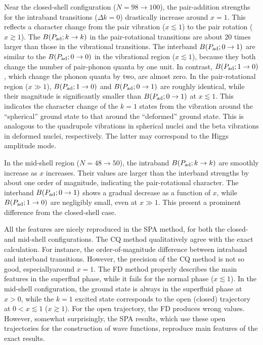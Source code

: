 \documentclass[%
superscriptaddress,
preprint,
showpacs,
nofootinbib,
amsmath,amssymb,
prc,
floatfix ]%
{revtex4-1}
\begin{document}
Near the closed-shell configuration ($N=98\rightarrow 100$),
the pair-addition strengths for the intraband transitions ($\Delta k=0$)
drastically increase around $x=1$.
This reflects a character change from the pair vibration ($x\lesssim 1$)
to the pair rotation ($x\gtrsim 1$).
The $B(P_{\rm ad}; k\rightarrow k)$ in the pair-rotational transitions
are about 20 times larger than those in the vibrational transitions.
The interband $B(P_{\rm ad}; 0\rightarrow 1)$ are similar to
the $B(P_{\rm ad}; 0\rightarrow 0)$ in the vibrational region
($x\lesssim 1$), because they both change the number of pair-phonon quanta
by one unit.
In contrast, $B(P_{\rm ad}; 1\rightarrow 0)$, which change the phonon
quanta by two, are almost zero.
In the pair-rotational region ($x \gg 1$),
$B(P_{\rm ad}; 1\rightarrow 0)$ and $B(P_{\rm ad}; 0\rightarrow 1)$
are roughly identical,
while their magnitude is significantly smaller than
$B(P_{\rm ad}; 0\rightarrow 1)$ at $x\lesssim 1$.
This indicates the character change of the $k=1$ states
from the vibration around the ``spherical'' ground state
to that around the ``deformed'' ground state.
This is analogous to the quadrupole vibrations in spherical nuclei
and the beta vibrations in deformed nuclei, respectively.
The latter may correspond to the Higgs amplitude mode.

In the mid-shell region ($N=48\rightarrow 50$),
the intraband $B(P_{\rm ad}; k\rightarrow k)$ are smoothly increase as
$x$ increases.
Their values are larger than the interband strengths by about one order
of magnitude, indicating the pair-rotational character.
The interband $B(P_{\rm ad}; 0\rightarrow 1)$ shows a gradual decrease
as a function of $x$, while
$B(P_{\rm ad}; 1\rightarrow 0)$ are negligibly small,
even at $x\gg 1$.
This present a prominent difference from the closed-shell case.

All the features are nicely reproduced in the SPA method,
for both the closed- and mid-shell configurations.
The CQ method qualitatively agree with the exact calculation.
For instance, the order-of-magnitude difference between intraband
and interband transitions.
However, the precision of the CQ method is not so good,
especiallyaround $x=1$.
The FD method properly describes the main features
in the superflud phase, while it fails for the normal phase
($x\lesssim 1$). 
In the mid-shell configuration, the ground state is always
in the superfluid phase at $x>0$,
while the $k=1$ excited state corresponds to
the open (closed) trajectory at $0<x\lesssim 1$ ($x\gtrsim 1$).
For the open trajectory, the FD produces wrong values.
However, somewhat surprisingly,
the SPA results, which use these open trajectories for the construction
of wave functions,
reproduce main features of the exact results.
\end{document}
